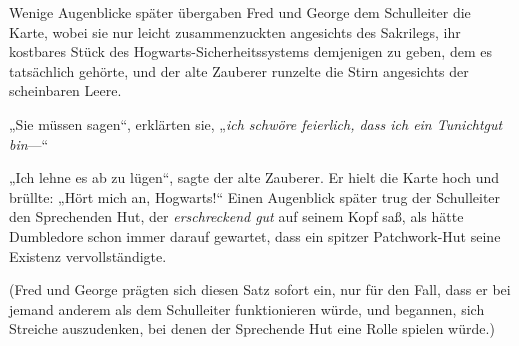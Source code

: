 Wenige Augenblicke später übergaben Fred und George dem Schulleiter die Karte, wobei sie nur leicht zusammenzuckten angesichts des Sakrilegs, ihr kostbares Stück des Hogwarts-Sicherheitssystems demjenigen zu geben, dem es tatsächlich gehörte, und der alte Zauberer runzelte die Stirn angesichts der scheinbaren Leere.

„Sie müssen sagen“, erklärten sie, „\emph{ich schwöre feierlich, dass ich ein Tunichtgut bin}—“

„Ich lehne es ab zu lügen“, sagte der alte Zauberer. Er hielt die Karte hoch und brüllte:
„Hört mich an, Hogwarts!“ 
Einen Augenblick später trug der Schulleiter den Sprechenden Hut, der \emph{erschreckend gut} auf seinem Kopf saß, als hätte Dumbledore schon immer darauf gewartet, dass ein spitzer Patchwork-Hut seine Existenz vervollständigte.

(Fred und George prägten sich diesen Satz sofort ein, nur für den Fall, dass er bei jemand anderem als dem Schulleiter funktionieren würde, und begannen, sich Streiche auszudenken, bei denen der Sprechende Hut eine Rolle spielen würde.)

